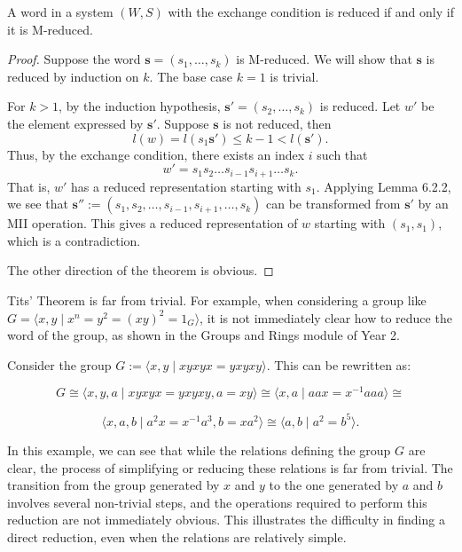 \documentclass[../main.tex]{subfiles}
\begin{document}
\begin{theorem}[Tits']
A word in a system $(W, S)$ with the exchange condition is reduced if and only if it is M-reduced.
    \begin{proof}
        Suppose the word \( \mathbf{s} = (s_1, \dots, s_k) \) is M-reduced. We will show that \( \mathbf{s} \) is reduced by induction on \( k \). The base case \( k = 1 \) is trivial.

        For \( k > 1 \), by the induction hypothesis, \( \mathbf{s'} = (s_2, \dots, s_k) \) is reduced. Let \( w' \) be the element expressed by \( \mathbf{s'} \). Suppose \( \mathbf{s} \) is not reduced, then
        \[
        l(w) = l(s_1 \mathbf{s'}) \leq k - 1 < l(\mathbf{s'}).
        \]
        Thus, by the exchange condition, there exists an index \( i \) such that 
        \[
        w' = s_1 s_2 \dots s_{i-1} s_{i+1} \dots s_k.
        \]
        That is, \( w' \) has a reduced representation starting with \( s_1 \). Applying Lemma 6.2.2, we see that \( \mathbf{s''} := (s_1, s_2, \dots, s_{i-1}, s_{i+1}, \dots, s_k) \) can be transformed from \( \mathbf{s'} \) by an MII operation. This gives a reduced representation of \( w \) starting with \( (s_1, s_1) \), which is a contradiction.

        The other direction of the theorem is obvious.
    \end{proof}
\end{theorem}

\begin{remark}
    Tits' Theorem is far from trivial. For example, when considering a group like \( G = \langle x, y \mid x^n = y^2 = (xy)^2 = 1_G \rangle \), it is not immediately clear how to reduce the word of the group, as shown in the Groups and Rings module of Year 2.
\end{remark}

\begin{example}
Consider the group \( G := \langle x, y \mid xyxyx = yxyxy \rangle \). This can be rewritten as:

\[
G \cong \langle x, y, a \mid xyxyx = yxyxy, a = xy \rangle \cong \langle x, a \mid aax = x^{-1} aaa \rangle \cong \]

\[
\langle x, a, b \mid a^2x = x^{-1}a^3, b = xa^2 \rangle \cong \langle a, b \mid a^2 = b^5 \rangle.
\]

In this example, we can see that while the relations defining the group \( G \) are clear, the process of simplifying or reducing these relations is far from trivial. The transition from the group generated by \( x \) and \( y \) to the one generated by \( a \) and \( b \) involves several non-trivial steps, and the operations required to perform this reduction are not immediately obvious. This illustrates the difficulty in finding a direct reduction, even when the relations are relatively simple.
\end{example}
\end{document}

